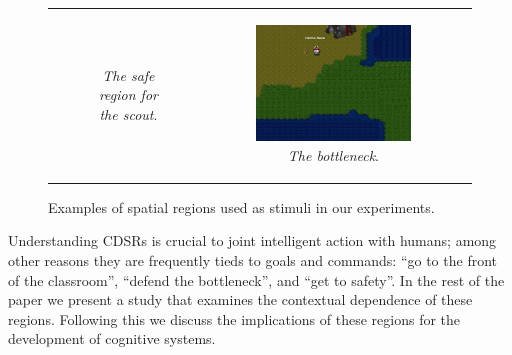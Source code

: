 \documentclass[11pt,letterpaper]{article}
\begin{document}
\begin{figure}
\begin{tabular}{c c c}
\begin{subfigure}[b]{0.32\textwidth}
  \caption{\textit{The safe region for the scout}.}
\end{subfigure} & 
\begin{subfigure}[b]{0.32\textwidth}
  \includegraphics[width=\textwidth]{figures/bottleneck.JPG}
 \caption{\textit{The bottleneck}.}
  \label{fig:safety}
  \end{subfigure}\\
\end{tabular}
  \caption{Examples of spatial regions used as stimuli in our experiments.}
  \label{fig:examples}
\end{figure}

Understanding CDSRs is crucial to joint intelligent action with humans; among other reasons they are frequently tieds to goals and commands: ``go to the front of the classroom'', ``defend the bottleneck'', and ``get to safety''. In the rest of the paper we present a study that examines the contextual dependence of these regions.  Following this we discuss the implications of these regions for the development of cognitive systems.
\end{document}
